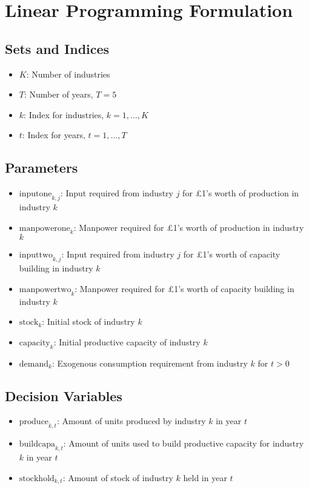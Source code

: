 \documentclass{article}
\begin{document}
\section*{Linear Programming Formulation}

\subsection*{Sets and Indices}
\begin{itemize}
    \item $K$: Number of industries
    \item $T$: Number of years, $T = 5$
    \item $k$: Index for industries, $k = 1, \ldots, K$
    \item $t$: Index for years, $t = 1, \ldots, T$
\end{itemize}

\subsection*{Parameters}
\begin{itemize}
    \item $\text{inputone}_{k, j}$: Input required from industry $j$ for £1's worth of production in industry $k$
    \item $\text{manpowerone}_{k}$: Manpower required for £1's worth of production in industry $k$
    \item $\text{inputtwo}_{k, j}$: Input required from industry $j$ for £1's worth of capacity building in industry $k$
    \item $\text{manpowertwo}_{k}$: Manpower required for £1's worth of capacity building in industry $k$
    \item $\text{stock}_k$: Initial stock of industry $k$
    \item $\text{capacity}_k$: Initial productive capacity of industry $k$
    \item $\text{demand}_k$: Exogenous consumption requirement from industry $k$ for $t > 0$
\end{itemize}

\subsection*{Decision Variables}
\begin{itemize}
    \item $\text{produce}_{k, t}$: Amount of units produced by industry $k$ in year $t$
    \item $\text{buildcapa}_{k, t}$: Amount of units used to build productive capacity for industry $k$ in year $t$
    \item $\text{stockhold}_{k, t}$: Amount of stock of industry $k$ held in year $t$
\end{itemize}
\end{document}
